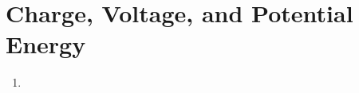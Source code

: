 \documentclass{article}
\begin{document}
\section{Charge, Voltage, and Potential Energy}

\begin{enumerate}
\item 
\end{enumerate}

%
\end{document}
